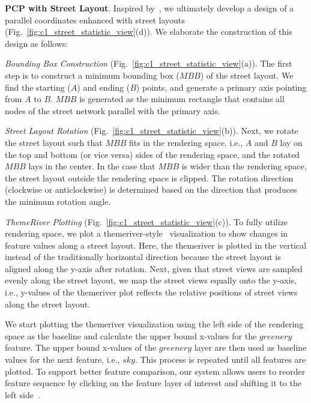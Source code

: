 \vspace*{2mm}
\noindent
\textbf{PCP with Street Layout}. Inspired by~\cite{qu_2007_visual}, we ultimately develop a design of a parallel coordinates enhanced with street layouts (Fig.~\ref{fig:c1_street_statistic_view}(d)).
We elaborate the construction of this design as follows:

\noindent
\textit{Bounding Box Construction} (Fig.~\ref{fig:c1_street_statistic_view}(a)).
The first step is to construct a minimum bounding box ($MBB$) of the street layout.
We find the starting ($A$) and ending ($B$) points, and generate a primary axis pointing from $A$ to $B$.
$MBB$ is generated as the minimum rectangle that contains all nodes of the street network parallel with the primary axis.

\noindent
\textit{Street Layout Rotation} (Fig.~\ref{fig:c1_street_statistic_view}(b)).
Next, we rotate the street layout such that $MBB$ fits in the rendering space, i.e., $A$ and $B$ lay on the top and bottom (or vice versa) sides of the rendering space, and the rotated $MBB$ lays in the center.
In the case that $MBB$ is wider than the rendering space, the street layout outside the rendering space is clipped.
The rotation direction (clockwise or anticlockwise) is determined based on the direction that produces the minimum rotation angle.

\noindent
\textit{ThemeRiver Plotting} (Fig.~\ref{fig:c1_street_statistic_view}(c)).
To fully utilize rendering space, we plot a themeriver-style~\cite{havre_2002_themeriver} visualization to show changes in feature values along a street layout.
Here, the themeriver is plotted in the vertical instead of the traditionally horizontal direction because the street layout is aligned along the y-axis after rotation.
Next, given that street views are sampled evenly along the street layout, we map the street views equally onto the y-axis, i.e., y-values of the themeriver plot reflects the relative positions of street views along the street layout.

We start plotting the themeriver visualization using the left side of the rendering space as the baseline and calculate the upper bound x-values for the $greenery$ feature.
The upper bound x-values of the $greenery$ layer are then used as baseline values for the next feature, i.e., $sky$.
This process is repeated until all features are plotted.
To support better feature comparison, our system allows users to reorder feature sequence by clicking on the feature layer of interest and shifting it to the left side~\cite{byron_2008_stacked}.

